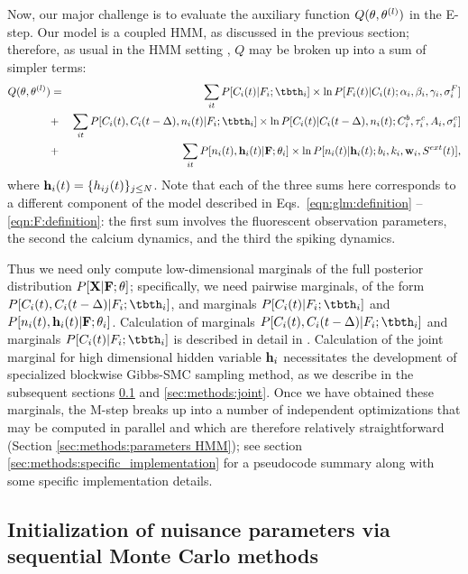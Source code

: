 Now, our major challenge is to evaluate the auxiliary function $Q(\mathbf{\theta},\mathbf{\theta}^{(l)})$ in the E-step. Our model is a coupled HMM, as discussed in the previous section; therefore, as usual in the HMM setting \cite{RAB89}, $Q$ may be broken up into a sum of simpler terms: 
\begin{eqnarray} Q(\bth,\bth^{(l)}) &=& \sum_{it} P[C_i(t) | F_i; \tbth_i] \times \ln P[F_i(t)|C_i(t); \alpha_i, \beta_i, \gamma_i, \sigma^F_i] \nonumber \\ &+& \sum_{it} P[C_i(t), C_i(t-\Delta), n_i(t) | F_i; \tbth_i] \times \ln P[C_i(t)|C_i(t-\Delta), n_i(t); C^b_i, \tau^c_i, A_i, \sigma^c_i] \nonumber \\ &+& \sum_{it} P[n_i(t), \bh_i(t) | \bF; \bth_i] \times \ln P[n_i(t)| \bh_i(t); b_i, k_i, \bw_i, S^{ext}(t)], \label{eqn:loglik:definition-expl} \end{eqnarray} 
\noindent where $\mathbf{h}_i(t)=\{h_{ij}(t)\}_{j \leq N}$. Note that each of the three sums here corresponds to a different component of the model described in Eqs.~\eqref{eqn:glm:definition} -- \eqref{eqn:F:definition}: the first sum involves the fluorescent observation parameters, the second the calcium dynamics, and the third the spiking dynamics.

Thus we need only compute low-dimensional marginals of the full posterior distribution $P[{\bf X} | {\bf F}; \mathbf{\theta}]$; specifically, we need pairwise marginals, of the form $P[C_i(t), C_i(t- \Delta) | F_i; \tbth_i]$, and marginals $P[C_i(t)|F_i;\tbth_i]$ and $P[n_i(t),\mathbf{h}_i(t)|{\bf F};\mathbf{\theta}_i]$. Calculation of marginals $P[C_i(t), C_i(t- \Delta) | F_i; \tbth_i]$ and marginals $P[C_i(t)|F_i;\tbth_i]$ is described in detail in \cite{Vogelstein2009}. Calculation of the joint marginal for high dimensional hidden variable $\mathbf{h}_i$ necessitates the development of specialized blockwise Gibbs-SMC sampling method, as we describe in the subsequent sections \ref{sec:methods:indep} and \ref{sec:methods:joint}. Once we have obtained these marginals, the M-step breaks up into a number of independent optimizations that may be computed in parallel and which are therefore relatively straightforward (Section \ref{sec:methods:parameters HMM}); see section \ref{sec:methods:specific_implementation} for a pseudocode summary along with some specific implementation details.


\subsection{Initialization of nuisance parameters via sequential
  Monte Carlo methods} \label{sec:methods:indep}

